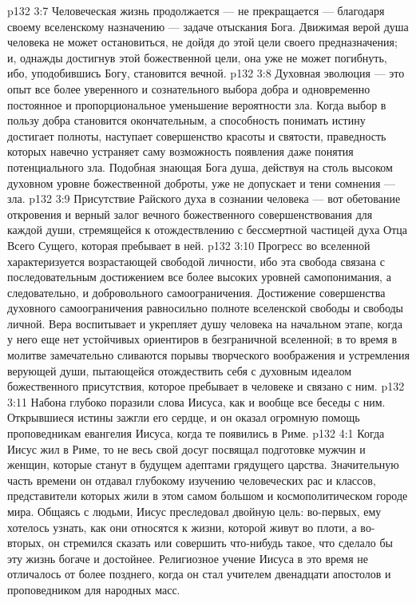 \vs p132 3:7 Человеческая жизнь продолжается --- не прекращается --- благодаря своему вселенскому назначению --- задаче отыскания Бога. Движимая верой душа человека не может остановиться, не дойдя до этой цели своего предназначения; и, однажды достигнув этой божественной цели, она уже не может погибнуть, ибо, уподобившись Богу, становится вечной.
\vs p132 3:8 \pc Духовная эволюция --- это опыт все более уверенного и сознательного выбора добра и одновременно постоянное и пропорциональное уменьшение вероятности зла. Когда выбор в пользу добра становится окончательным, а способность понимать истину достигает полноты, наступает совершенство красоты и святости, праведность которых навечно устраняет саму возможность появления даже понятия потенциального зла. Подобная знающая Бога душа, действуя на столь высоком духовном уровне божественной доброты, уже не допускает и тени сомнения --- зла.
\vs p132 3:9 Присутствие Райского духа в сознании человека --- вот обетование откровения и верный залог вечного божественного совершенствования для каждой души, стремящейся к отождествлению с бессмертной частицей духа Отца Всего Сущего, которая пребывает в ней.
\vs p132 3:10 Прогресс во вселенной характеризуется возрастающей свободой личности, ибо эта свобода связана с последовательным достижением все более высоких уровней самопонимания, а следовательно, и добровольного самоограничения. Достижение совершенства духовного самоограничения равносильно полноте вселенской свободы и свободы личной. Вера воспитывает и укрепляет душу человека на начальном этапе, когда у него еще нет устойчивых ориентиров в безграничной вселенной; в то время в молитве замечательно сливаются порывы творческого воображения и устремления верующей души, пытающейся отождествить себя с духовным идеалом божественного присутствия, которое пребывает в человеке и связано с ним.
\vs p132 3:11 \pc Набона глубоко поразили слова Иисуса, как и вообще все беседы с ним. Открывшиеся истины зажгли его сердце, и он оказал огромную помощь проповедникам евангелия Иисуса, когда те появились в Риме.
\vs p132 4:1 Когда Иисус жил в Риме, то не весь свой досуг посвящал подготовке мужчин и женщин, которые станут в будущем адептами грядущего царства. Значительную часть времени он отдавал глубокому изучению человеческих рас и классов, представители которых жили в этом самом большом и космополитическом городе мира. Общаясь с людьми, Иисус преследовал двойную цель: во\hyp{}первых, ему хотелось узнать, как они относятся к жизни, которой живут во плоти, а во\hyp{}вторых, он стремился сказать или совершить что\hyp{}нибудь такое, что сделало бы эту жизнь богаче и достойнее. Религиозное учение Иисуса в это время не отличалось от более позднего, когда он стал учителем двенадцати апостолов и проповедником для народных масс.
